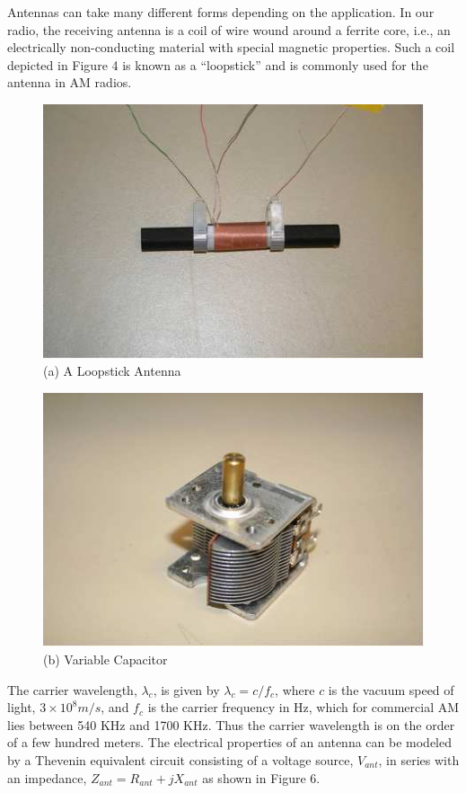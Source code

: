 \documentclass[a4paper]{article}
\begin{document}
Antennas can take many different forms depending on the application. In our radio, the receiving antenna is a coil of wire wound around a ferrite core, i.e., an electrically non-conducting material with special magnetic properties. Such a coil depicted in Figure 4 is known as a “loopstick” and is commonly used for the antenna in AM radios.
\begin{figure}[H]
	\centering
	\includegraphics[width=0.7\linewidth]{4.jpg}
	\caption{(a) A Loopstick Antenna}
\end{figure}
\begin{figure}[H]
	\centering
	\includegraphics[width=0.7\linewidth]{5.jpg}
	\caption{(b) Variable Capacitor}
\end{figure}
The carrier wavelength, $\lambda_c$, is given by $\lambda_c=c/f_c$, where $c$ is the vacuum speed of light, $3\times10^8m/s$, and $f_c$ is the carrier frequency in Hz, which for commercial AM lies between 540 KHz and 1700 KHz. Thus the carrier wavelength is on the order of a few hundred meters. The electrical properties of an antenna can be modeled by a Thevenin equivalent circuit consisting of a voltage source, $V_{ant}$, in series with an impedance, $Z_{ant}=R_{ant}+jX_{ant}$ as shown in Figure 6.
\end{document}
